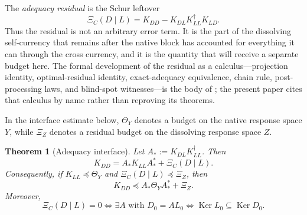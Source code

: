 \documentclass[11pt]{article}
\DeclareMathOperator{\Ker}{Ker}
\newcommand{\XiRes}{\Xi}
\newcommand{\preceqq}{\preceq}
\newtheorem{theorem}{Theorem}[section]
\theoremstyle{definition}
\begin{document}
The \emph{adequacy residual} is the Schur leftover
\[
  \XiRes_C(D\mid L)=K_{DD}-K_{DL}K_{LL}^\dagger K_{LD}.
\]
Thus the residual is not an arbitrary error term.  It is the part of the
dissolving self-currency that remains after the native block has
accounted for everything it can through the cross currency, and it is
the quantity that will receive a separate budget here.  The formal
development of the residual as a calculus---projection identity,
optimal-residual identity, exact-adequacy equivalence, chain rule,
post-processing laws, and blind-spot witnesses---is the body of
\citet{Tsiokos2026XiCompanion}; the present paper cites that calculus by
name rather than reproving its theorems.

In the interface estimate below, \(\Theta_Y\) denotes a budget on the
native response space \(Y\), while \(\Xi_Z\) denotes a residual
budget on the dissolving response space \(Z\).

\begin{theorem}[Adequacy interface]\label{thm:main:adequacy-interface}
Let \(A_*:=K_{DL}K_{LL}^\dagger\).  Then
\[
  K_{DD}=A_*K_{LL}A_*^*+\XiRes_C(D\mid L).
\]
Consequently, if \(K_{LL}\preceqq\Theta_Y\) and
\(\XiRes_C(D\mid L)\preceqq\Xi_Z\), then
\[
  K_{DD}\preceqq A_*\Theta_YA_*^*+\Xi_Z.
\]
Moreover,
\[
  \XiRes_C(D\mid L)=0
  \iff \exists A\text{ with }D_0=AL_0
  \iff \Ker L_0\subseteq\Ker D_0.
\]
\end{theorem}
\end{document}
